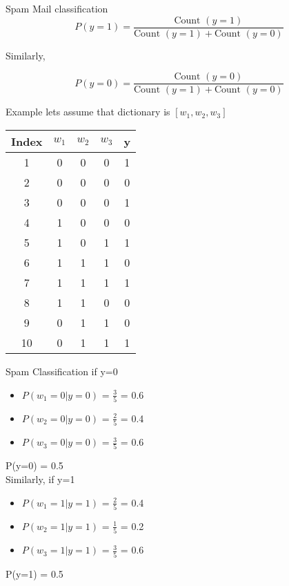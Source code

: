 \documentclass{beamer}
\begin{document}
\begin{frame}{Spam Mail classification}
    $$
        P(y = 1) = \frac{\text{Count }(y=1) }{\text{Count }(y=1) +\text{Count }(y=0) }
    $$
    
    Similarly,
    
    $$
        P(y = 0) = \frac{\text{Count }(y=0) }{\text{Count }(y=1) +\text{Count }(y=0) }
    $$
    
    
    
\end{frame}

\begin{frame}{Example}
    lets assume that dictionary is $[w_{1},w_{2},w_{3}]$
    
    
    \begin{tabular}{c|c|c|c|c}
    Index&$w_{1}$&$w_{2}$&$w_{3}$&y\\
    \hline
    \hline
         1 & 0 & 0 & 0 & 1  \\
         2 & 0 & 0 & 0 & 0  \\
         3 & 0 & 0 & 0 & 1  \\
         4 & 1 & 0 & 0 & 0  \\
         5 & 1 & 0 & 1 & 1  \\
         6 & 1 & 1 & 1 & 0  \\
         7 & 1 & 1 & 1 & 1  \\
         8 & 1 & 1 & 0 & 0  \\
         9 & 0 & 1 & 1 & 0  \\
         10 & 0 & 1 & 1 & 1  \\
    \end{tabular}
\end{frame}

\begin{frame}{Spam Classification}
    if y=0
    \begin{itemize}
        \item $P(w_{1}=0\vert y=0)$ = $\frac{3}{5}$ = 0.6 \\
        \item $P(w_{2}=0\vert y=0)$ = $\frac{2}{5}$ = 0.4 \\
        \item $P(w_{3}=0\vert y=0)$ = $\frac{3}{5}$ = 0.6 \\
    \end{itemize}
    P(y=0) = 0.5\\
    Similarly, if y=1
    \begin{itemize}
        \item $P(w_{1}=1\vert y=1)$ = $\frac{2}{5}$ = 0.4 \\
        \item $P(w_{2}=1\vert y=1)$ = $\frac{1}{5}$ = 0.2 \\
        \item $P(w_{3}=1\vert y=1)$ = $\frac{3}{5}$ = 0.6 \\
    \end{itemize}
    P(y=1) = 0.5
\end{frame}
\end{document}
